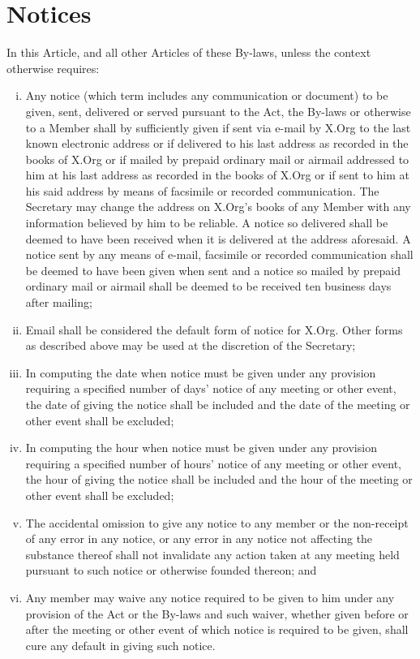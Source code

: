 \documentclass[10pt, english]{bylaws}
\begin{document}
\section{Notices}
In this Article, and all other Articles of these By-laws, unless the context
otherwise requires:

\begin{enumerate}[(i)\hspace{.2cm}]
	\item Any notice (which term includes any communication or document) to
	be given, sent, delivered or served pursuant to the Act, the By-laws or
	otherwise to a Member shall by sufficiently given if sent via e-mail by
	X.Org to the last known electronic address or if delivered to his last
	address as recorded in the books of X.Org or if mailed by prepaid
	ordinary mail or airmail addressed to him at his last address as
	recorded in the books of X.Org or if sent to him at his said address by
	means of facsimile or recorded communication. The Secretary may change
	the address on X.Org's books of any Member with any information believed
	by him to be reliable. A notice so delivered shall be deemed to have
	been received when it is delivered at the address aforesaid. A notice
	sent by any means of e-mail, facsimile or recorded communication shall
	be deemed to have been given when sent and a notice so mailed by
	prepaid ordinary mail or airmail shall be deemed to be received ten
	business days after mailing;

	\item Email shall be considered the default form of notice for X.Org.
	Other forms as described above may be used at the discretion of the
	Secretary;

	\item In computing the date when notice must be given under any
	provision requiring a specified number of days' notice of any meeting or
	other event, the date of giving the notice shall be included and the
	date of the meeting or other event shall be excluded;

	\item In computing the hour when notice must be given under any
	provision requiring a specified number of hours' notice of any meeting
	or other event, the hour of giving the notice shall be included and the
	hour of the meeting or other event shall be excluded;

	\item The accidental omission to give any notice to any member or the
	non-receipt of any error in any notice, or any error in any notice not
	affecting the substance thereof shall not invalidate any action taken at
	any meeting held pursuant to such notice or otherwise founded thereon;
	and

	\item Any member may waive any notice required to be given to him under
	any provision of the Act or the By-laws and such waiver, whether given
	before or after the meeting or other event of which notice is required
	to be given, shall cure any default in giving such notice.
\end{enumerate}
\end{document}
